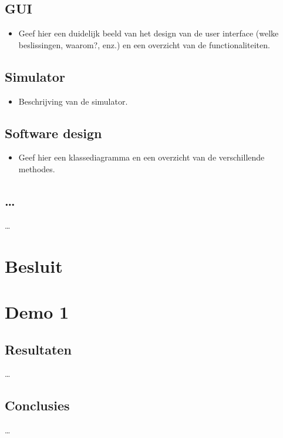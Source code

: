\documentclass[tt1]{penoverslag}
\begin{document}
\subsection{GUI}
\begin{itemize}
\item Geef hier een duidelijk beeld van het design van de user interface (welke beslissingen, waarom?, enz.) en een overzicht van de functionaliteiten.
\end{itemize}

\subsection{Simulator}
\begin{itemize}
\item Beschrijving van de simulator.
\end{itemize}

\subsection{Software design}
\begin{itemize}
\item Geef hier een klassediagramma en een overzicht van de verschillende methodes.
\end{itemize}

\subsection{\ldots}
\ldots


\section{Besluit}
\lipsum[6-7]



\newpage
\makeappendix

\section{Demo 1}

\subsection{Resultaten}
\ldots

\subsection{Conclusies}
\ldots
\end{document}
